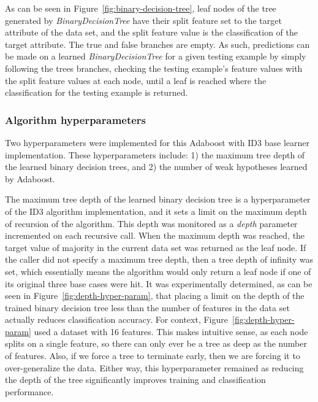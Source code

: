 \documentclass[a4paper]{article}
\begin{document}
As can be seen in Figure~\ref{fig:binary-decision-tree}, leaf nodes of the tree generated by \textit{BinaryDecisionTree} have their split feature set to the target attribute of the data set, and the split feature value is the classification of the target attribute. The true and false branches are empty. As such, predictions can be made on a learned \textit{BinaryDecisionTree} for a given testing example by simply following the trees branches, checking the testing example's feature values with the split feature values at each node, until a leaf is reached where the classification for the testing example is returned.

\subsubsection{Algorithm hyperparameters}
Two hyperparameters were implemented for this Adaboost with ID3 base learner implementation. These hyperparameters include: 1) the maximum tree depth of the learned binary decision trees, and 2) the number of weak hypotheses learned by Adaboost. 

The maximum tree depth of the learned binary decision tree is a hyperparameter of the ID3 algorithm implementation, and it sets a limit on the maximum depth of recursion of the algorithm. This depth was monitored as a \textit{depth} parameter incremented on each recursive call. When the maximum depth was reached, the target value of majority in the current data set was returned as the leaf node. If the caller did not specify a maximum tree depth, then a tree depth of infinity was set, which essentially means the algorithm would only return a leaf node if one of its original three base cases were hit. It was experimentally determined, as can be seen in Figure~\ref{fig:depth-hyper-param}, that placing a limit on the depth of the trained binary decision tree less than the number of features in the data set actually reduces classification accuracy. For context, Figure~\ref{fig:depth-hyper-param} used a dataset with 16 features. This makes intuitive sense, as each node splits on a single feature, so there can only ever be a tree as deep as the number of features. Also, if we force a tree to terminate early, then we are forcing it to over-generalize the data. Either way, this hyperparameter remained as reducing the depth of the tree significantly improves training and classification performance. 
\end{document}
